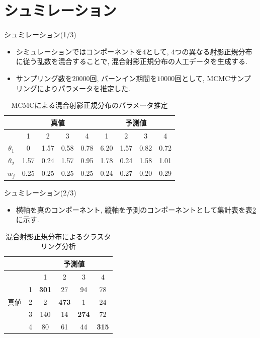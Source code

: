 \documentclass[dvipdfmx]{beamer} %
\begin{document}
\section{シュミレーション}
\begin{frame}{シュミレーション(1/3)}

\begin{itemize}
\item
シミュレーションではコンポーネントを$4$として, $4$つの異なる射影正規分布に従う乱数を混合することで, 混合射影正規分布の人工データを生成する.
\item
サンプリング数を$20000$回, バーンイン期間を$10000$回として, MCMCサンプリングによりパラメータを推定した.

\end{itemize}

\begin{table}[tbp]
\begin{center}
\caption{MCMCによる混合射影正規分布のパラメータ推定}
\label{cross1}
\begin{tabular}{c|c c c c|c c c c}
\hline
  & \multicolumn{4}{c}{真値} & \multicolumn{4}{c}{予測値}\\ \hline
  & 1 & 2 & 3 & 4 & 1 & 2 & 3 & 4 \\ \hline 
$\theta_1$ & 0 & 1.57 & 0.58 & 0.78 & 6.20 & 1.57 & 0.82 & 0.72 \\ 
$\theta_2$ & 1.57 & 0.24 & 1.57 & 0.95 & 1.78 & 0.24 & 1.58 & 1.01\\
$w_j$ & 0.25 & 0.25 & 0.25 & 0.25 & 0.24 & 0.27 & 0.20 & 0.29\\
\hline
\end{tabular}
\end{center}
\end{table}

\end{frame}

\begin{frame}{シュミレーション(2/3)}

\begin{itemize}
	\item 
	横軸を真のコンポーネント, 縦軸を予測のコンポーネントとして集計表を表\ref{cross2}に示す.
\end{itemize}

\begin{table}[tbp]
\begin{center}
\caption{混合射影正規分布によるクラスタリング分析}
\label{cross2}
\begin{tabular}{c|c|c c c c}
\hline
 &  & \multicolumn{4}{c}{予測値} \\ \hline
 &  & 1 & 2 & 3 & 4  \\ \hline 
 & 1 &  \textbf{301} & 27  & 94 & 78 \\ 
真値
 & 2 & 2 & \textbf{473} & 1 & 24 \\
 & 3 & 140 & 14 & \textbf{274} &72 \\ 
 & 4 & 80 & 61 & 44 & \textbf{315} \\ 
\hline
\end{tabular}
\end{center}
\end{table}
\end{frame}
\end{document}
